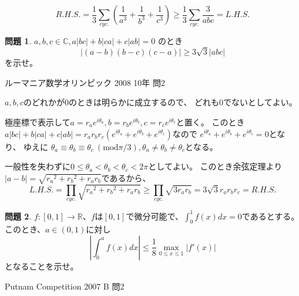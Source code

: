 \documentclass[uplatex, a5paper]{jsarticle}
\makeatletter
\theoremstyle{definition}
\newtheorem{prob}{問題}
\renewenvironment{proof}[1][\proofname]{
  \pushQED{\qed}%
  \normalfont \topsep6\p@\@plus6\p@\relax
  \trivlist
  \item[\hskip\labelsep
    #1\@addpunct{\textbf{.}}]\ignorespaces
}{%
  \popQED\endtrivlist\@endpefalse
}
\providecommand{\proofname}{証明}
\newcommand{\lhs }{ L.H.S. }
\newcommand{\rhs }{ R.H.S. }
\def\qed{\hfill $\Box$}
\makeatother
\begin{document}
\begin{proof}
  \[
  \rhs = \frac{1}{3}\sum_{cyc.} \left( \frac{1}{a^3} + \frac{1}{b^3} + \frac{1}{c^3} \right)
  \geq \frac{1}{3}\sum_{cyc.} \frac{3}{abc} = \lhs
  \]
\end{proof}










\newpage

\begin{prob}
  \(a,b,c\in \mathbb{C} , a|bc|+b|ca|+c|ab|=0\)
  のとき
  \[
  |(a-b)(b-c)(c-a)| \geq 3\sqrt{3}|abc|
  \]
  を示せ。
  \begin{flushright}
    ルーマニア数学オリンピック 2008 10年 問2
  \end{flushright}
\end{prob}


\begin{proof}
  \(a,b,c\)のどれかが\(0\)のときは明らかに成立するので、
  どれも\(0\)でないとしてよい。

  極座標で表示して\(a= r_a e^{i\theta _a}, b= r_b e^{i\theta _b}, c= r_c e^{i\theta _c}\)と置く。
  このとき
  \(a|bc|+b|ca|+c|ab| = r_a r_b r_c \left( e^{i\theta _a} + e^{i \theta _b} + e^{i\theta _c } \right)\)なので
  \(e^{i\theta _a} + e^{i \theta _b} + e^{i\theta _c }=0\)となり、
  ゆえに
  \(\theta _a \equiv \theta _b \equiv \theta _c \ ( \mathrm{mod} \pi /3 )
  , \theta _a \neq \theta _b \neq \theta _c\)となる。

  一般性を失わずに\(0 \leq \theta _a < \theta _b < \theta _c < 2\pi\)としてよい。
  このとき余弦定理より\(|a-b|= \sqrt{ {r_a}^2 + {r_b}^2 + r_ar_b }\)であるから、
  \[
  \lhs = \prod_{cyc.} \sqrt{ {r_a}^2 + {r_b}^2 + r_ar_b }
  \geq \prod_{cyc.} \sqrt{ 3r_ar_b } = 3\sqrt{3}r_a r_b r_c = \rhs
  \]
\end{proof}









\newpage


\begin{prob}
  \(f:[0,1]\to \mathbb{R}\)、\(f\)は\([0,1]\)で微分可能で、\(\int_0^1 f(x)dx=0\)であるとする。
  このとき、\(a\in (0,1)\)に対し
  \[
  \left| \int_0^a f(x)dx \right| \leq \frac{1}{8}\max_{0\leq x \leq 1} |f'(x)|
  \]
  となることを示せ。
  \begin{flushright}
    Putnam Competition 2007 B 問2
  \end{flushright}
\end{prob}
\end{document}
